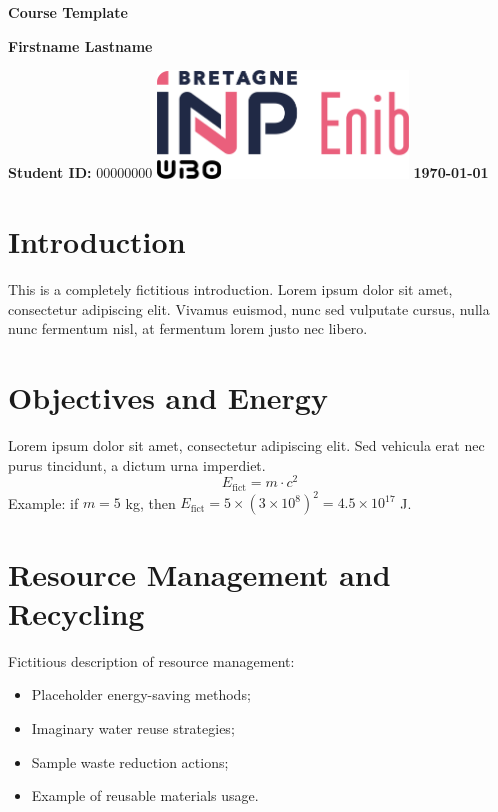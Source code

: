 \documentclass[12pt]{article}
\begin{document}
\begin{titlepage}
    \centering
    \vspace*{1cm}
    \Huge
    \textbf{Course Template}
    \vspace{1.5cm}
    
    \LARGE
    \textbf{Firstname Lastname}
    \vspace{0.5cm}
    
    \large
    \textbf{Student ID:} 00000000
    \vfill
    \includegraphics[width=0.5\textwidth]{enib_inp.png}
    \vfill
    \Large
    \textbf{\today}
\end{titlepage}

\newpage
\tableofcontents
\newpage

\section{Introduction}
This is a completely fictitious introduction. Lorem ipsum dolor sit amet, consectetur adipiscing elit. Vivamus euismod, nunc sed vulputate cursus, nulla nunc fermentum nisl, at fermentum lorem justo nec libero.

\section{Objectives and Energy}
Lorem ipsum dolor sit amet, consectetur adipiscing elit. Sed vehicula erat nec purus tincidunt, a dictum urna imperdiet.  
\[
E_{\text{fict}} = m \cdot c^2
\]
Example: if $m = 5$ kg, then $E_{\text{fict}} = 5 \times (3\times10^8)^2 = 4.5\times10^{17}$ J.

\section{Resource Management and Recycling}
Fictitious description of resource management:  
\begin{itemize}
    \item Placeholder energy-saving methods;
    \item Imaginary water reuse strategies;
    \item Sample waste reduction actions;
    \item Example of reusable materials usage.
\end{itemize}
\end{document}

